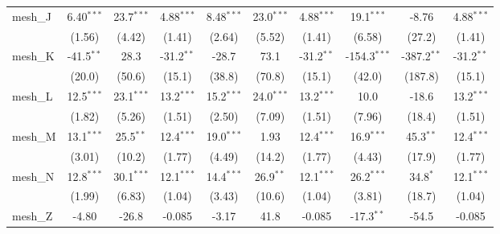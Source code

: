 \begin{tabular}{lccccccccc}
   mesh\_J                                                     & 6.40$^{***}$  & 23.7$^{***}$  & 4.88$^{***}$  & 8.48$^{***}$ & 23.0$^{***}$ & 4.88$^{***}$  & 19.1$^{***}$   & -8.76          & 4.88$^{***}$\\   
                                                               & (1.56)        & (4.42)        & (1.41)        & (2.64)       & (5.52)       & (1.41)        & (6.58)         & (27.2)         & (1.41)\\   
   mesh\_K                                                     & -41.5$^{**}$  & 28.3          & -31.2$^{**}$  & -28.7        & 73.1         & -31.2$^{**}$  & -154.3$^{***}$ & -387.2$^{**}$  & -31.2$^{**}$\\   
                                                               & (20.0)        & (50.6)        & (15.1)        & (38.8)       & (70.8)       & (15.1)        & (42.0)         & (187.8)        & (15.1)\\   
   mesh\_L                                                     & 12.5$^{***}$  & 23.1$^{***}$  & 13.2$^{***}$  & 15.2$^{***}$ & 24.0$^{***}$ & 13.2$^{***}$  & 10.0           & -18.6          & 13.2$^{***}$\\   
                                                               & (1.82)        & (5.26)        & (1.51)        & (2.50)       & (7.09)       & (1.51)        & (7.96)         & (18.4)         & (1.51)\\   
   mesh\_M                                                     & 13.1$^{***}$  & 25.5$^{**}$   & 12.4$^{***}$  & 19.0$^{***}$ & 1.93         & 12.4$^{***}$  & 16.9$^{***}$   & 45.3$^{**}$    & 12.4$^{***}$\\   
                                                               & (3.01)        & (10.2)        & (1.77)        & (4.49)       & (14.2)       & (1.77)        & (4.43)         & (17.9)         & (1.77)\\   
   mesh\_N                                                     & 12.8$^{***}$  & 30.1$^{***}$  & 12.1$^{***}$  & 14.4$^{***}$ & 26.9$^{**}$  & 12.1$^{***}$  & 26.2$^{***}$   & 34.8$^{*}$     & 12.1$^{***}$\\   
                                                               & (1.99)        & (6.83)        & (1.04)        & (3.43)       & (10.6)       & (1.04)        & (3.81)         & (18.7)         & (1.04)\\   
   mesh\_Z                                                     & -4.80         & -26.8         & -0.085        & -3.17        & 41.8         & -0.085        & -17.3$^{**}$   & -54.5          & -0.085\\   

\end{tabular}

